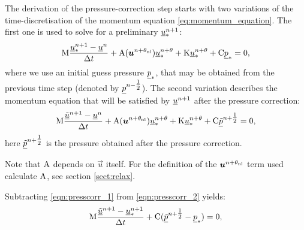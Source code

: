 The derivation of the pressure-correction step starts with two
variations of the time-discretisation of the
momentum equation \eqref{eq:momentum_equation}. The first
one is used to solve for a preliminary $\underline{u}_*^{n+1}$:
\begin{equation}\label{eqn:presscorr_1}
\mathrm{M}  \frac{{\underline{u}_*^{n+1}-\underline{u}^{n}}}{\Delta t}
    +\mathrm{A}({\mbox{\boldmath$u$}}^{n+\theta_{\mathrm{nl}}})\underline{u}_*^{n+\theta}+\mathrm{K}\underline{u}_*^{n+\theta}
    +\mathrm{C} \underline{p}_*
    =0,
\end{equation}
where we use an initial guess pressure $\underline{p}_*$, that may
be obtained from the previous time step (denoted by
$\underline{p}^{n-\tfrac 12}$). %
The second variation
describes the momentum equation that will be satisfied by
$\underline{u}^{n+1}$ after the pressure correction:
\begin{equation}\label{eqn:presscorr_2}
\mathrm{M}  \frac{{\underline{\tilde u}^{n+1}-\underline{u}^{n}}}{\Delta t}
    +\mathrm{A}({\mbox{\boldmath$u$}}^{n+\theta_{\mathrm{nl}}})\underline{u}_*^{n+\theta}+\mathrm{K}\underline{u}_*^{n+\theta}
    +\mathrm{C} \underline{\tilde p}^{n+\tfrac 12}
    =0,
\end{equation}
here $\underline{\tilde p}^{n+\tfrac 12}$ is the pressure
obtained after the pressure correction.

Note that $\mathrm{A}$ depends on $\vec{u}$ itself. For the definition of the
${\mbox{\boldmath$u$}}^{n+\theta_{\mathrm{nl}}}$ term used calculate $\mathrm{A}$, see section \ref{sect:relax}.

Subtracting \eqref{eqn:presscorr_1} from \eqref{eqn:presscorr_2} yields:
\begin{equation}\label{eqn:presscorr_substract}
\mathrm{M}  \frac{{\underline{\tilde u}^{n+1}-\underline{u}_*^{n+1}}}{\Delta t}
    + \mathrm{C} ( \underline{\tilde p}^{n+\tfrac 12} - \underline{p}_*)
    =0,
\end{equation}

